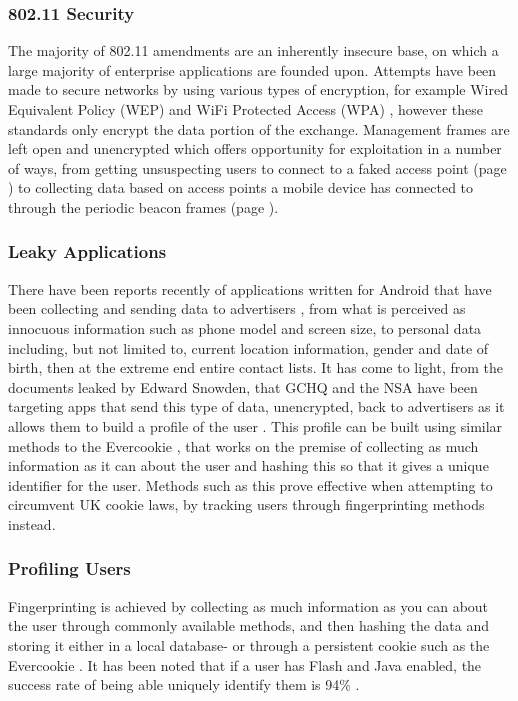 \subsubsection{802.11 Security}

The majority of 802.11 amendments are an inherently insecure \cite{intro:80211_lecture} base, on which a large majority of enterprise applications are founded upon. Attempts have been made to secure networks by using various types of encryption, for example Wired Equivalent Policy (WEP) \cite{intro:netgear_wep} and WiFi Protected Access (WPA) \cite{intro:wiki_wpa}, however these standards only encrypt the data portion of the exchange. Management frames are left open and unencrypted which offers opportunity for exploitation in a number of ways, from getting unsuspecting users to connect to a faked access point (page \pageref{sec:spoofap}) to collecting data based on access points a mobile device has connected to through the periodic beacon frames (page \pageref{sec:honeypot}).
 
\subsubsection{Leaky Applications}
\label{intro:leaked-data}
There have been reports recently of applications written for Android that have been collecting and sending data to advertisers  \cite{intro:bbc_flashlight_app}, from what is perceived as innocuous information such as phone model and screen size, to personal data including, but not limited to, current location information, gender and date of birth, then at the extreme end entire contact lists. It has come to light, from the documents leaked by Edward Snowden, that GCHQ and the NSA have been targeting apps that send this type of data, unencrypted, back to advertisers as it allows them to build a profile of the user \cite{intro:angry_leak}. This profile can be built using similar methods to the Evercookie \cite{intro:evercookie}, that works on the premise of collecting as much information as it can about the user and hashing this so that it gives a unique identifier for the user. Methods such as this prove effective when attempting to circumvent UK cookie laws, by tracking users through fingerprinting methods instead.

\subsubsection{Profiling Users}

Fingerprinting is achieved by collecting as much information as you can about the user through commonly available methods, and then hashing the data and storing it either in a local database- or through a persistent cookie such as the Evercookie \cite{intro:evercookie}. It has been noted that if a user has Flash and Java enabled, the success rate of being able uniquely identify them is 94\% \cite{intro:unique_browser}. 


